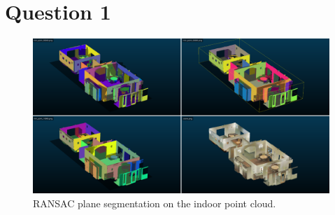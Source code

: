 \documentclass[a4paper]{article}
\begin{document}





\section*{Question 1}
\begin{figure}[ht]
  \centering
  \includegraphics[width=0.9\linewidth]{figures/ransac_cloud_compare_comparison.png}
  \caption{RANSAC plane segmentation on the indoor point cloud.}
  \label{fig:hoppe_vs_imls_vs_spr}
\end{figure}
\end{document}
